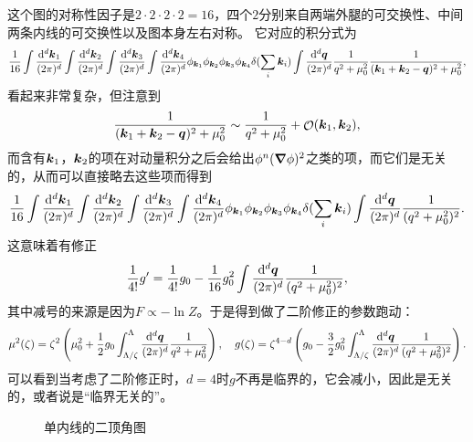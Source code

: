 \documentclass[hyperref, UTF8, a4paper]{ctexart}
\DeclareMathOperator{\bigO}{\mathcal{O}}
\begin{document}
这个图的对称性因子是$2 \cdot 2 \cdot 2 \cdot 2 = 16$，四个$2$分别来自两端外腿的可交换性、中间两条内线的可交换性以及图本身左右对称。
它对应的积分式为
\[
    \frac{1}{16} \int \frac{\dd[d]{\vb*{k}_1}}{(2\pi)^d} \int \frac{\dd[d]{\vb*{k}_2}}{(2\pi)^d} \int \frac{\dd[d]{\vb*{k}_3}}{(2\pi)^d} \int \frac{\dd[d]{\vb*{k}_4}}{(2\pi)^d} \phi_{\vb*{k}_1} \phi_{\vb*{k}_2} \phi_{\vb*{k}_3} \phi_{\vb*{k}_4} \delta(\sum_{i} \vb*{k}_i) \int \frac{\dd[d]{\vb*{q}}}{(2\pi)^d} \frac{1}{q^2 + \mu_0^2} \frac{1}{(\vb*{k}_1 + \vb*{k}_2 - \vb*{q})^2 + \mu_0^2},
\]
看起来非常复杂，但注意到
\[
    \frac{1}{(\vb*{k}_1 + \vb*{k}_2 - \vb*{q})^2 + \mu_0^2} \sim \frac{1}{q^2 + \mu_0^2} + \bigO(\vb*{k}_1, \vb*{k}_2),
\]
而含有$\vb*{k}_1$，$\vb*{k}_2$的项在对动量积分之后会给出$\phi^n (\grad{\phi})^2$之类的项，而它们是无关的，从而可以直接略去这些项而得到
\[
    \frac{1}{16} \int \frac{\dd[d]{\vb*{k}_1}}{(2\pi)^d} \int \frac{\dd[d]{\vb*{k}_2}}{(2\pi)^d} \int \frac{\dd[d]{\vb*{k}_3}}{(2\pi)^d} \int \frac{\dd[d]{\vb*{k}_4}}{(2\pi)^d} \phi_{\vb*{k}_1} \phi_{\vb*{k}_2} \phi_{\vb*{k}_3} \phi_{\vb*{k}_4} \delta(\sum_{i} \vb*{k}_i) \int \frac{\dd[d]{\vb*{q}}}{(2\pi)^d} \frac{1}{(q^2 + \mu_0^2)^2}.
\]
这意味着有修正
\[
    \frac{1}{4!} g' = \frac{1}{4!} g_0 - \frac{1}{16} g_0^2 \int \frac{\dd[d]{\vb*{q}}}{(2\pi)^d} \frac{1}{(q^2 + \mu_0^2)^2},
\]
其中减号的来源是因为$F \propto - \ln Z$。于是得到做了二阶修正的参数跑动：
\begin{equation}
    \mu^2(\zeta) = \zeta^2 \left( \mu_0^2 + \frac{1}{2} g_0 \int^\Lambda_{\Lambda/\zeta} \frac{\dd[d]{\vb*{q}}}{(2\pi)^d} \frac{1}{q^2 + \mu_0^2} \right), \quad g(\zeta) = \zeta^{4-d} \left( g_0 - \frac{3}{2} g_0^2 \int^\Lambda_{\Lambda/\zeta} \frac{\dd[d]{\vb*{q}}}{(2\pi)^d} \frac{1}{(q^2 + \mu_0^2)^2} \right).
    \label{eq:coupling-running-2}
\end{equation}
可以看到当考虑了二阶修正时，$d=4$时$g$不再是临界的，它会减小，因此是无关的，或者说是“临界无关的”。

\begin{figure}
    \centering
    \caption{单内线的二顶角图}
    \label{fig:single-second-order-correction}
\end{figure}
\end{document}
